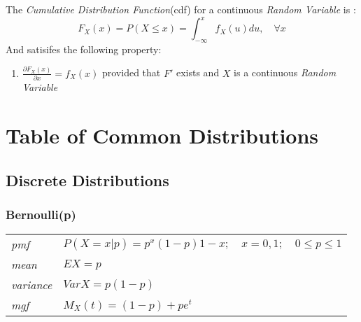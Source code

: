 \documentclass[12pt]{article}
\begin{document}
The \emph{Cumulative Distribution Function}(cdf) for a continuous \emph{Random Variable} is \cite[p.5]{classnotes.4}:
$$F_X(x)=P(X \leq x) = \int_{-\infty}^{x}f_X(u)du, \quad \forall x$$
And satisifes the following property:
\begin{enumerate}
\item $\frac{\partial F_X(x)}{\partial x}=f_X(x)$ provided that $F'$ exists and $X$ is a continuous \emph{Random Variable}
\end{enumerate}

\section*{Table of Common Distributions}
\subsection*{Discrete Distributions}
\subsubsection*{Bernoulli(p) \cite[p. 621]{StatisticalInference}}
\begin{tabularx}{\textwidth}{ l X }
\emph{pmf} & $P(X=x|p)=p^x(1-p)1-x; \quad x=0, 1; \quad 0 \leq p \leq 1$ \\
\emph{mean} & $EX=p$ \\
\emph{variance} & $Var X =p(1-p)$ \\
\emph{mgf} & $M_X(t)=(1-p)+pe^t$ \\
\end{tabularx}


\newpage


\end{document}
